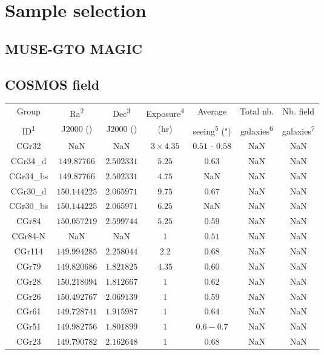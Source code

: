 \clearpage
\section{Sample selection}
\label{sec:Sample_selection}

\subsection{MUSE-GTO MAGIC}

\subsection{COSMOS field}

\begin{table}[htbp]

	\hspace{50pt}

	\begin{tabular}{ccccccc}
	\hline
	Group & Ra\textsuperscript{2} & Dec\textsuperscript{3} & Exposure\textsuperscript{4}  & Average & Total nb. & Nb. field \\
	
	ID\textsuperscript{1} & J2000 (\degree) & J2000 (\degree) & (hr) & seeing\textsuperscript{5} (") & galaxies\textsuperscript{6} & galaxies\textsuperscript{7} \\	
	
	
	\hline
	CGr32 & NaN & NaN & $3 \times 4.35$ & $0.51$ - $0.58$ & NaN & NaN \\
	\hline
	CGr34\_d & $149.87766$ & $2.502331$ & $5.25$ & $0.63$ & NaN & NaN \\
	\hline
	CGr34\_bs & $149.87766$ & $2.502331$ & $4.75$ & NaN & NaN & NaN \\
	\hline
	CGr30\_d & $150.144225$ & $2.065971$ & $9.75$ & $0.67$ & NaN & NaN \\
	\hline
	CGr30\_bs & $150.144225$ & $2.065971$ & $6.25$ & NaN & NaN & NaN \\
	\hline
	CGr84 & $150.057219$ & $2.599744$ & $5.25$ & $0.59$ & NaN & NaN \\
	\hline
	CGr84-N & NaN & NaN & $1$ & $0.51$ & NaN & NaN \\
	\hline
	CGr114 & $149.994285$ & $2.258044$ & $2.2$ & $0.68$ & NaN & NaN \\
	\hline
	CGr79 & $149.820686$ & $1.821825$ & $4.35$ & $0.60$ & NaN & NaN \\
	\hline
	CGr28 & $150.218094$ & $1.812667$ & $1$ & $0.62$ & NaN & NaN \\
	\hline
	CGr26 & $150.492767$ & $2.069139$ & $1$ & $0.59$ & NaN & NaN \\
	\hline
	CGr61 & $149.728741$ & $1.915987$ & $1$ & $0.64$ & NaN & NaN \\
	\hline
	CGr51 & $149.982756$ & $1.801899$ & $1$ & $0.6-0.7$ & NaN & NaN \\
	\hline
	CGr23 & $149.790782$ & $2.162648$ & $1$ & $0.68$ & NaN & NaN \\
	\hline
	

\end{tabular}
\end{table}
